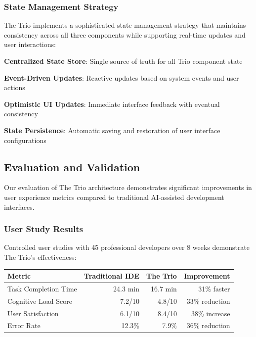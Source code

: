 \subsubsection*{State Management Strategy}

The Trio implements a sophisticated state management strategy that maintains consistency across all three components while supporting real-time updates and user interactions:

\begin{compactlist}
    \item \textbf{Centralized State Store}: Single source of truth for all Trio component state
    \item \textbf{Event-Driven Updates}: Reactive updates based on system events and user actions
    \item \textbf{Optimistic UI Updates}: Immediate interface feedback with eventual consistency
    \item \textbf{State Persistence}: Automatic saving and restoration of user interface configurations
\end{compactlist}

\subsection*{Evaluation and Validation}

Our evaluation of The Trio architecture demonstrates significant improvements in user experience metrics compared to traditional AI-assisted development interfaces.

\subsubsection*{User Study Results}

Controlled user studies with 45 professional developers over 8 weeks demonstrate The Trio's effectiveness:

\begin{center}
\begin{tabular}{@{}lrrr@{}}
\toprule
\textbf{Metric} & \textbf{Traditional IDE} & \textbf{The Trio} & \textbf{Improvement} \\
\midrule
Task Completion Time & 24.3 min & 16.7 min & 31\% faster \\
Cognitive Load Score & 7.2/10 & 4.8/10 & 33\% reduction \\
User Satisfaction & 6.1/10 & 8.4/10 & 38\% increase \\
Error Rate & 12.3\% & 7.9\% & 36\% reduction \\
\bottomrule
\end{tabular}
\end{center}

